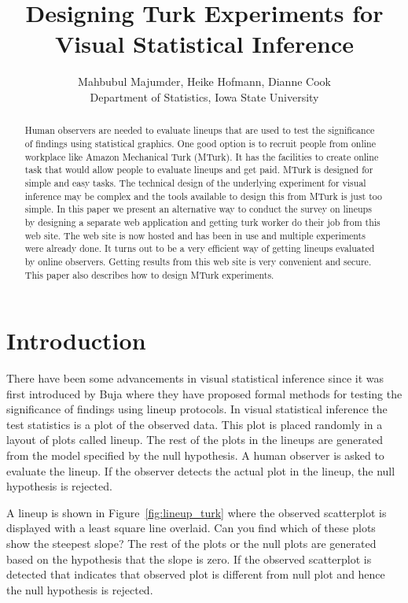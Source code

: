 \documentclass[11pt]{article}
\title{Designing Turk Experiments for Visual Statistical Inference}
\author{Mahbubul Majumder, Heike Hofmann, Dianne Cook\\
        Department of Statistics, Iowa State University}
\begin{document}
\tableofcontents

\maketitle


\begin {abstract} 

Human observers are needed to evaluate lineups that are used to test the significance of findings using statistical graphics. One good option is to recruit people from online workplace like Amazon Mechanical Turk (MTurk). It has the facilities to create online task that would allow people to evaluate lineups and get paid. MTurk is designed for simple and easy tasks. The technical design of the underlying experiment for visual inference may be complex and the tools available to design this from MTurk is just too simple. In this paper we present an alternative way to conduct the survey on lineups by designing a separate web application and getting turk worker do their job from this web site. The web site is now hosted and has been in use and multiple experiments were already done. It turns out to be a very efficient way of getting lineups evaluated by online observers. Getting results from this web site is very convenient and secure. This paper also describes how to design MTurk experiments.

\end {abstract}


\section{Introduction} 

There have been some advancements in visual statistical inference since it was first introduced by Buja \cite{buja:2009} where they have proposed formal methods for testing the significance of findings using lineup protocols. In visual statistical inference the test statistics is a plot of the observed data. This plot is placed randomly in a layout of plots called lineup. The rest of the plots in the lineups are generated from the model specified by the null hypothesis. A human observer is asked to evaluate the lineup. If the observer detects the actual plot in the lineup, the null hypothesis is rejected. 

A lineup is shown in Figure~\ref{fig:lineup_turk} where the observed scatterplot is displayed with a least square line overlaid. Can you find which of these plots show the steepest slope? The rest of the plots or the null plots are generated based on the hypothesis that the slope is zero. If the observed scatterplot is detected that indicates that observed plot is different from null plot and hence the null hypothesis is rejected.
\end{document}
